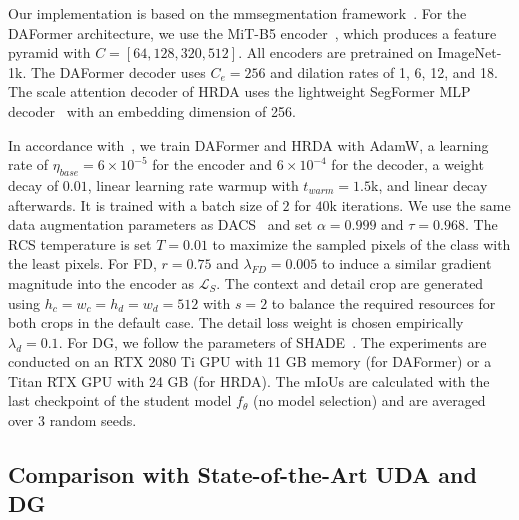 \documentclass[journal,compsoc]{IEEEtran}
\begin{document}
Our implementation is based on the mmsegmentation framework~\cite{mmseg2020}. For the DAFormer architecture, we use the MiT-B5 encoder~\cite{xie2021segformer}, which produces a feature pyramid with $C=[64, 128, 320, 512]$. All encoders are pretrained on ImageNet-1k. The DAFormer decoder uses $C_e=256$ and dilation rates of 1, 6, 12, and 18.
The scale attention decoder of HRDA uses the lightweight SegFormer MLP decoder~\cite{xie2021segformer} with an embedding dimension of 256.

In accordance with~\cite{xie2021segformer}, we train DAFormer and HRDA with AdamW, a learning rate of $\eta_\mathit{base} {=} 6 {\times} 10^{-5}$ for the encoder and $ 6 {\times} 10^{-4}$ for the decoder, a weight decay of $0.01$, linear learning rate warmup with $t_\mathit{warm}{=}1.5$k, and linear decay afterwards. It is trained with a batch size of $2$ for $40$k iterations.
We use the same data augmentation parameters as DACS~\cite{tranheden2021dacs} and set $\alpha{=}0.999$ and $\tau{=}0.968$.
The RCS temperature is set $T{=}0.01$ to maximize the sampled pixels of the class with the least pixels.
For FD, $r{=}0.75$ and $\lambda_\mathit{FD} {=} 0.005$ to induce a similar gradient magnitude into the encoder as $\mathcal{L}_S$.
The context and detail crop are generated using $h_c{=}w_c{=}h_d{=}w_d{=}512$ with $s{=}2$ to balance the required resources for both crops in the default case. The detail loss weight is chosen empirically $\lambda_d{=}0.1$. 
For DG, we follow the parameters of SHADE~\cite{zhao2022style}.
The experiments are conducted on an RTX 2080 Ti GPU with 11 GB memory (for DAFormer) or a Titan RTX GPU with 24 GB (for HRDA). The mIoUs are calculated with the last checkpoint of the student model $f_\theta$ (no model selection) and are averaged over 3 random seeds.

\subsection{Comparison with State-of-the-Art UDA and DG}
\end{document}
